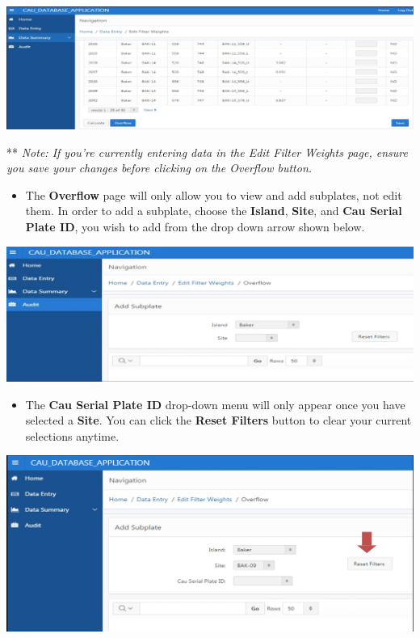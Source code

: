 \documentclass[]{book}
\providecommand{\tightlist}{%
  \setlength{\itemsep}{0pt}\setlength{\parskip}{0pt}}
\begin{document}
\includegraphics{images/Data16.jpg}

** \emph{Note: If you're currently entering data in the Edit Filter Weights page, ensure you save your changes before clicking on the Overflow button.}

\begin{itemize}
\tightlist
\item
  The \textbf{Overflow} page will only allow you to view and add subplates, not edit them. In order to add a subplate, choose the \textbf{Island}, \textbf{Site}, and \textbf{Cau Serial Plate ID}, you wish to add from the drop down arrow shown below.
\end{itemize}

\includegraphics{images/Data17.jpg}

\begin{itemize}
\tightlist
\item
  The \textbf{Cau Serial Plate ID} drop-down menu will only appear once you have selected a \textbf{Site}. You can click the \textbf{Reset Filters} button to clear your current selections anytime.
\end{itemize}

\includegraphics{images/Data18.jpg}
\end{document}
